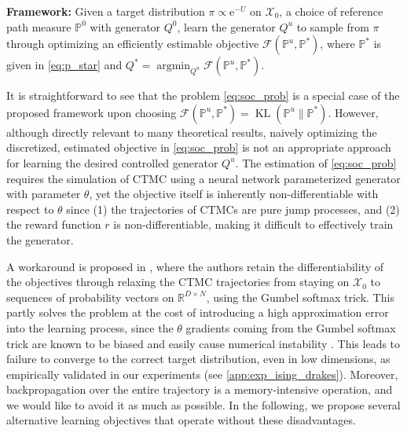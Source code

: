 \documentclass{article}
\theoremstyle{remark}
\newcommand{\e}{\mathrm{e}}
\renewcommand{\P}{\mathbb{P}}
\newcommand{\argmin}{\mathop\mathrm{argmin}}
\newcommand{\kl}{\operatorname{KL}}
\newcommand{\cF}{\mathcal{F}}
\newcommand{\cX}{\mathcal{X}}
\begin{document}
\begin{tcolorbox}[colback=gray!10, colframe=black, boxrule=0.5pt, arc=2pt, left=1mm, right=1mm, top=1mm, bottom=1mm]
\textbf{Framework: } Given a target distribution $\pi \propto \e^{-U}$ on $\cX_0$, a choice of reference path measure $\P^0$ with generator $Q^0$, learn the generator $Q^u$ to sample from $\pi$ through optimizing an efficiently estimable objective $\cF(\P^u, \P^*)$, where $\P^*$ is given in \cref{eq:p_star} and $Q^* = \argmin_{Q^u} \cF(\P^u, \P^*)$.
\end{tcolorbox}

It is straightforward to see that the problem \cref{eq:soc_prob} is a special case of the proposed framework upon choosing $\cF(\P^u, \P^*) = \kl(\P^u \| \P^*)$. However, although directly relevant to many theoretical results, naively optimizing the discretized, estimated objective in \cref{eq:soc_prob} is not an appropriate approach for learning the desired controlled generator $Q^u$. The estimation of \cref{eq:soc_prob} requires the simulation of CTMC using a neural network parameterized generator with parameter $\theta$, yet the objective itself is inherently non-differentiable with respect to $\theta$ since (1) the trajectories of CTMCs are pure jump processes, and (2) the reward function $r$ is non-differentiable, making it difficult to effectively train the generator. 

A workaround is proposed in \cite{wang2025finetuning}, where the authors retain the differentiability of the objectives through relaxing the CTMC trajectories from staying on $\cX_0$ to sequences of probability vectors on $\mathbb{R}^{D \times N}$, using the Gumbel softmax trick. This partly solves the problem at the cost of introducing a high approximation error into the learning process, since the $\theta$ gradients coming from the Gumbel softmax trick are known to be biased and easily cause numerical instability \cite{jang2017categorical, liu2023bridging}. This leads to failure to converge to the correct target distribution, even in low dimensions, as empirically validated in our experiments (see \cref{app:exp_ising_drakes}). Moreover, backpropagation over the entire trajectory is a memory-intensive operation, and we would like to avoid it as much as possible. In the following, we propose several alternative
%
learning objectives that operate without these disadvantages.
\end{document}
